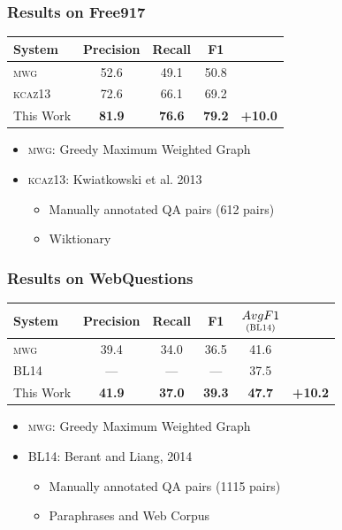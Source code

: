 \documentclass[mathserif,12pt]{beamer}
\newcommand \kcaz{\textsc{kcaz13}\xspace}
\newcommand \mwg{\textsc{mwg}\xspace}
\newcommand \free{Free917\xspace}
\newcommand \webq{WebQuestions\xspace}
\begin{document}
\begin{frame}
\frametitle{Results on \free}

\begin{table}
\begin{tabular}{|l| c c c c|}
  \hline
  System  & Precision & Recall & F1 &  \\
  \hline
  \textsc{mwg} & 52.6 & 49.1 & 50.8 & \\
   \kcaz & 72.6 & 66.1 & 69.2 & \\
   This Work  & \bf 81.9 & \bf  76.6 & \bf 79.2 & \color{blue} \bf +10.0 \\
   \hline
\end{tabular}
\end{table}

\begin{itemize}
  \item {\color{blue!70} \mwg:} Greedy Maximum Weighted Graph
  \item {\color{blue!70} \kcaz:} Kwiatkowski et al. 2013 
  \begin{itemize}
    \item Manually annotated QA pairs (612 pairs)
    \item Wiktionary
  \end{itemize}
\end{itemize}
\end{frame}

\begin{frame}
\frametitle{Results on \webq}
\begin{table}
\begin{tabular}{|l| c c c c c|}   
  \hline
  System  & Precision & Recall & F1 & $\underset{(\textsc{BL14})}{Avg F1}$ & \\
  \hline
  \textsc{mwg} & 39.4 & 34.0 & 36.5 & 41.6 & \\
  \textsc{BL14} & --- & --- & --- & 37.5 & \\
  This Work  & \bf 41.9 & \bf 37.0 & \bf 39.3 & \bf 47.7 &  \color{blue} \bf +10.2 \\
  \hline
\end{tabular}
\end{table}


\begin{itemize}
  \setlength\itemsep{1em}
  \item {\color{blue!70} \mwg:} Greedy Maximum Weighted Graph
  
  \item {\color{blue!70} \textsc{BL14:}} Berant and Liang, 2014
  \begin{itemize}
    \item Manually annotated QA pairs (1115 pairs)
    \item Paraphrases and Web Corpus
  \end{itemize} 
\end{itemize}
\end{frame}
\end{document}
